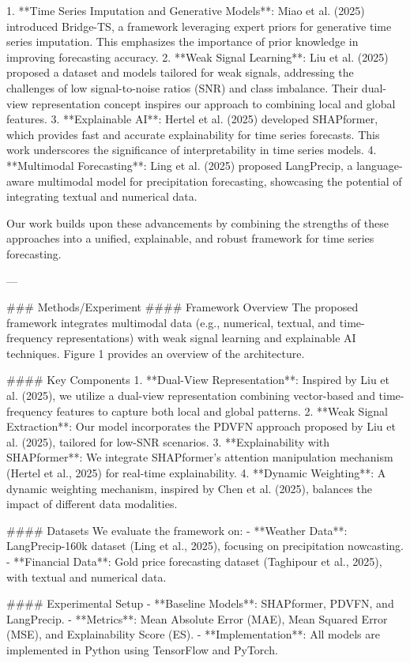 1. **Time Series Imputation and Generative Models**: Miao et al. (2025) introduced Bridge-TS, a framework leveraging expert priors for generative time series imputation. This emphasizes the importance of prior knowledge in improving forecasting accuracy.  
2. **Weak Signal Learning**: Liu et al. (2025) proposed a dataset and models tailored for weak signals, addressing the challenges of low signal-to-noise ratios (SNR) and class imbalance. Their dual-view representation concept inspires our approach to combining local and global features.  
3. **Explainable AI**: Hertel et al. (2025) developed SHAPformer, which provides fast and accurate explainability for time series forecasts. This work underscores the significance of interpretability in time series models.  
4. **Multimodal Forecasting**: Ling et al. (2025) proposed LangPrecip, a language-aware multimodal model for precipitation forecasting, showcasing the potential of integrating textual and numerical data.  

Our work builds upon these advancements by combining the strengths of these approaches into a unified, explainable, and robust framework for time series forecasting.

---

### Methods/Experiment  
#### Framework Overview  
The proposed framework integrates multimodal data (e.g., numerical, textual, and time-frequency representations) with weak signal learning and explainable AI techniques. Figure 1 provides an overview of the architecture.

#### Key Components  
1. **Dual-View Representation**: Inspired by Liu et al. (2025), we utilize a dual-view representation combining vector-based and time-frequency features to capture both local and global patterns.
2. **Weak Signal Extraction**: Our model incorporates the PDVFN approach proposed by Liu et al. (2025), tailored for low-SNR scenarios.
3. **Explainability with SHAPformer**: We integrate SHAPformer's attention manipulation mechanism (Hertel et al., 2025) for real-time explainability.
4. **Dynamic Weighting**: A dynamic weighting mechanism, inspired by Chen et al. (2025), balances the impact of different data modalities.

#### Datasets  
We evaluate the framework on:  
- **Weather Data**: LangPrecip-160k dataset (Ling et al., 2025), focusing on precipitation nowcasting.  
- **Financial Data**: Gold price forecasting dataset (Taghipour et al., 2025), with textual and numerical data.  

#### Experimental Setup  
- **Baseline Models**: SHAPformer, PDVFN, and LangPrecip.  
- **Metrics**: Mean Absolute Error (MAE), Mean Squared Error (MSE), and Explainability Score (ES).  
- **Implementation**: All models are implemented in Python using TensorFlow and PyTorch.


